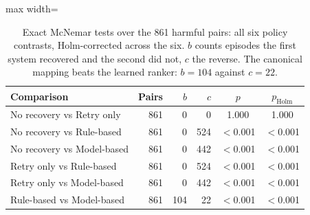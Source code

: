 \begin{table}[!ht]
\centering\scriptsize
\setlength{\tabcolsep}{4pt}
\caption{Exact McNemar tests over the 861 harmful pairs: all six policy contrasts, Holm-corrected across the six. $b$ counts episodes the first system recovered and the second did not, $c$ the reverse. The canonical mapping beats the learned ranker: $b=104$ against $c=22$.}
\label{tab:appendix_tests_policy}
\begin{adjustbox}{max width=\textwidth}
\begin{tabular}{@{}lrrrcc@{}}
\toprule
Comparison & Pairs & $b$ & $c$ & $p$ & $p_{\text{Holm}}$ \\
\midrule
No recovery vs Retry only & 861 & 0 & 0 & 1.000 & 1.000 \\
No recovery vs Rule-based & 861 & 0 & 524 & \ensuremath{<}0.001 & \ensuremath{<}0.001 \\
No recovery vs Model-based & 861 & 0 & 442 & \ensuremath{<}0.001 & \ensuremath{<}0.001 \\
Retry only vs Rule-based & 861 & 0 & 524 & \ensuremath{<}0.001 & \ensuremath{<}0.001 \\
Retry only vs Model-based & 861 & 0 & 442 & \ensuremath{<}0.001 & \ensuremath{<}0.001 \\
Rule-based vs Model-based & 861 & 104 & 22 & \ensuremath{<}0.001 & \ensuremath{<}0.001 \\
\bottomrule
\end{tabular}
\end{adjustbox}
\end{table}
